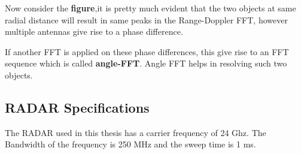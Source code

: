 Now consider the \textbf{figure},it is pretty much evident that the two objects at same radial distance will result in same peaks in the Range-Doppler FFT, however multiple antennas give rise to a phase difference.




If another FFT is applied on these phase differences, this give rise to an FFT sequence which is called \textbf{angle-FFT}. Angle FFT helps in resolving such two objects.




\subsection{RADAR Specifications}
The RADAR used in this thesis has a carrier frequency of 24 Ghz. The Bandwidth of the frequency is 250 MHz and the sweep time is 1 ms.

